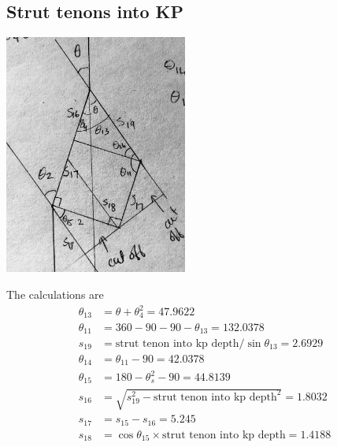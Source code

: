 \documentclass{article}\usepackage[]{graphicx}\usepackage[]{xcolor}
\begin{document}
\subsection{Strut tenons into KP}
\begin{center}\end{center}
\begin{center}
	\includegraphics[width=0.45\textwidth]{images/strut_kp_tenon_detail}
\end{center}

The calculations are 
\begin{align*}
  \theta_{13} &= \theta + \theta_4^2 = 47.9622\\
  \theta_{11} &= 360 - 90 - 90 - \theta_{13} = 132.0378\\
  s_{19} &= \text{strut tenon into kp depth}/\sin\theta_{13} = 2.6929\\
  \theta_{14} &= \theta_{11} - 90 = 42.0378\\
  \theta_{15} &= 180 - \theta_s^2 - 90 = 44.8139\\
  s_{16} &= \sqrt{s_{19}^2 - \text{strut tenon into kp depth}^2} = 1.8032\\
  s_{17} &= s_{15} - s_{16} = 5.245\\
  s_{18} &= \cos\theta_{15}\times \text{strut tenon into kp depth} = 1.4188
\end{align*}












\end{document}
